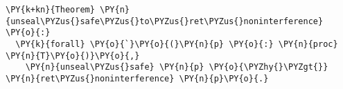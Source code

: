 \begin{BVerbatim}[commandchars=\\\{\},codes={\catcode`\$=3\catcode`\^=7\catcode`\_=8},fontsize=\footnotesize]
\PY{k+kn}{Theorem} \PY{n}{unseal\PYZus{}safe\PYZus{}to\PYZus{}ret\PYZus{}noninterference} \PY{o}{:}
  \PY{k}{forall} \PY{o}{`}\PY{o}{(}\PY{n}{p} \PY{o}{:} \PY{n}{proc} \PY{n}{T}\PY{o}{)}\PY{o}{,}
    \PY{n}{unseal\PYZus{}safe} \PY{n}{p} \PY{o}{\PYZhy{}\PYZgt{}} \PY{n}{ret\PYZus{}noninterference} \PY{n}{p}\PY{o}{.}
\end{BVerbatim}

